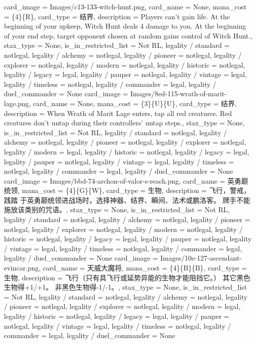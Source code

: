 \documentclass[lang = cn, color = black, 10pt]{AllThatStax}
\begin{document}
\card
{
	card_image = Images/c13-133-witch-hunt.png,
	card_name = None,
	mana_cost = \{4\}\{R\},
	card_type = 结界,
	description = Players can't gain life.
	At the beginning of your upkeep, Witch Hunt deals 4 damage to you.
	At the beginning of your end step, target opponent chosen at random gains control of Witch Hunt.,
	stax_type = None,
	is_in_restricted_list = Not RL,
	legality / standard = notlegal,
	legality / alchemy = notlegal,
	legality / pioneer = notlegal,
	legality / explorer = notlegal,
	legality / modern = notlegal,
	legality / historic = notlegal,
	legality / legacy = legal,
	legality / pauper = notlegal,
	legality / vintage = legal,
	legality / timeless = notlegal,
	legality / commander = legal,
	legality / duel_commander = None
}
\card
{
	card_image = Images/8ed-115-wrath-of-marit-lage.png,
	card_name = None,
	mana_cost = \{3\}\{U\}\{U\},
	card_type = 结界,
	description = When Wrath of Marit Lage enters, tap all red creatures.
	Red creatures don't untap during their controllers' untap steps.,
	stax_type = None,
	is_in_restricted_list = Not RL,
	legality / standard = notlegal,
	legality / alchemy = notlegal,
	legality / pioneer = notlegal,
	legality / explorer = notlegal,
	legality / modern = legal,
	legality / historic = notlegal,
	legality / legacy = legal,
	legality / pauper = notlegal,
	legality / vintage = legal,
	legality / timeless = notlegal,
	legality / commander = legal,
	legality / duel_commander = None
}
\card
{
	card_image = Images/bbd-74-archon-of-valor-s-reach.png,
	card_name = 英勇巅统领,
	mana_cost = \{4\}\{G\}\{W\},
	card_type = 生物,
	description = 飞行，警戒，践踏
	于英勇巅统领进战场时，选择神器、结界、瞬间、法术或鹏洛客。
	牌手不能施放该类别的咒语。,
	stax_type = None,
	is_in_restricted_list = Not RL,
	legality / standard = notlegal,
	legality / alchemy = notlegal,
	legality / pioneer = notlegal,
	legality / explorer = notlegal,
	legality / modern = notlegal,
	legality / historic = notlegal,
	legality / legacy = legal,
	legality / pauper = notlegal,
	legality / vintage = legal,
	legality / timeless = notlegal,
	legality / commander = legal,
	legality / duel_commander = None
}
\card
{
	card_image = Images/10e-127-ascendant-evincar.png,
	card_name = 天威大魔将,
	mana_cost = \{4\}\{B\}\{B\},
	card_type = 生物,
	description = 飞行（只有具飞行或延势异能的生物才能阻挡它。）
	其它黑色生物得+1/+1。
	非黑色生物得-1/-1。,
	stax_type = None,
	is_in_restricted_list = Not RL,
	legality / standard = notlegal,
	legality / alchemy = notlegal,
	legality / pioneer = notlegal,
	legality / explorer = notlegal,
	legality / modern = legal,
	legality / historic = notlegal,
	legality / legacy = legal,
	legality / pauper = notlegal,
	legality / vintage = legal,
	legality / timeless = notlegal,
	legality / commander = legal,
	legality / duel_commander = None
}
\end{document}
